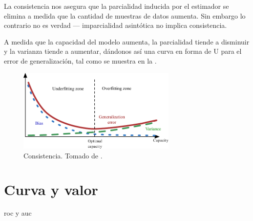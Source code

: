 La consistencia nos asegura que la parcialidad inducida por el estimador se elimina a medida que la cantidad de muestras de datos aumenta. Sin embargo lo contrario no es verdad --- imparcialidad asintótica no implica consistencia.

A medida que la capacidad del modelo aumenta, la parcialidad tiende a disminuir y la varianza tiende a aumentar, dándonos así una curva en forma de U para el error de generalización, tal como se muestra en la .

\begin{figure}[H]
  \centering
  \includegraphics[width=0.7\textwidth]{Figures/consistency.pdf}
  \decoRule
  \caption[Consistencia]{Consistencia. Tomado de \cite{deeplearning}.}
  \label{fig:consistency}
\end{figure}


\section{Curva  y valor }
\gls{roc} y \gls{auc}
